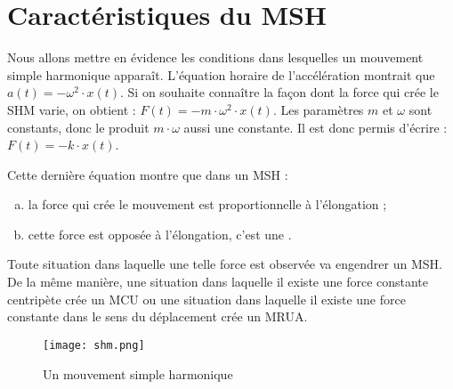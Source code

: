 \newpage

\section{Caractéristiques du MSH}
Nous allons mettre en évidence les conditions dans lesquelles un mouvement simple harmonique apparaît.
L'équation horaire de l'accélération montrait que \(a(t)=- \omega ^2 \cdot  x(t)\). Si on souhaite connaître la façon dont la force qui crée le SHM varie, on obtient : \(F(t)=- m \cdot \omega ^2 \cdot x(t)\). Les paramètres \(m\) et \(\omega\) sont constants, donc le produit \(m \cdot \omega\) aussi une constante. Il est donc permis d'écrire : \(F(t)=- k \cdot x(t)\).

Cette dernière équation montre que dans un MSH :
\begin{enumerate}[(a)]
    \item la force qui crée le mouvement est proportionnelle à l'élongation ;
    \item cette force est opposée à l'élongation, c'est une .
\end{enumerate}


Toute situation dans laquelle une telle force est observée va engendrer un MSH. De la même manière, une situation dans laquelle il existe une force constante centripète crée un MCU ou une situation dans laquelle il existe une force constante dans le sens du déplacement crée un MRUA.


\begin{figure}[h!]
    \centering
    \texttt{[image: shm.png]}
    \caption{Un mouvement simple harmonique}
    \label{shm}
\end{figure}
